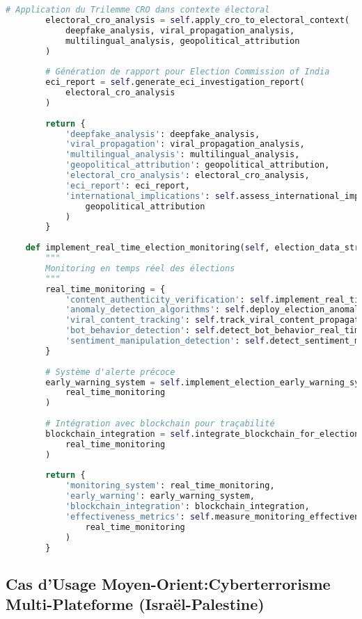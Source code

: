 \begin{lstlisting}[language=Python, caption=Investigation de manipulation électorale par IA]
        # Application du Trilemme CRO dans contexte électoral
        electoral_cro_analysis = self.apply_cro_to_electoral_context(
            deepfake_analysis, viral_propagation_analysis, 
            multilingual_analysis, geopolitical_attribution
        )
        
        # Génération de rapport pour Election Commission of India
        eci_report = self.generate_eci_investigation_report(
            electoral_cro_analysis
        )
        
        return {
            'deepfake_analysis': deepfake_analysis,
            'viral_propagation': viral_propagation_analysis,
            'multilingual_analysis': multilingual_analysis,
            'geopolitical_attribution': geopolitical_attribution,
            'electoral_cro_analysis': electoral_cro_analysis,
            'eci_report': eci_report,
            'international_implications': self.assess_international_implications(
                geopolitical_attribution
            )
        }
    
    def implement_real_time_election_monitoring(self, election_data_streams):
        """
        Monitoring en temps réel des élections
        """
        real_time_monitoring = {
            'content_authenticity_verification': self.implement_real_time_verification(),
            'anomaly_detection_algorithms': self.deploy_election_anomaly_detection(),
            'viral_content_tracking': self.track_viral_content_propagation(),
            'bot_behavior_detection': self.detect_bot_behavior_real_time(),
            'sentiment_manipulation_detection': self.detect_sentiment_manipulation()
        }
        
        # Système d'alerte précoce
        early_warning_system = self.implement_election_early_warning_system(
            real_time_monitoring
        )
        
        # Intégration avec blockchain pour traçabilité
        blockchain_integration = self.integrate_blockchain_for_election_integrity(
            real_time_monitoring
        )
        
        return {
            'monitoring_system': real_time_monitoring,
            'early_warning': early_warning_system,
            'blockchain_integration': blockchain_integration,
            'effectiveness_metrics': self.measure_monitoring_effectiveness(
                real_time_monitoring
            )
        }
\end{lstlisting}

\subsection{Cas d'Usage Moyen-Orient:Cyberterrorisme Multi-Plateforme (Israël-Palestine)}

